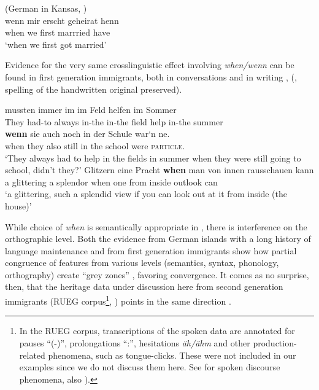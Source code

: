 \documentclass[output=paper]{langscibook}
\begin{document}
\ea%
    \label{ex:tsehaye:geheiratet}(German in Kansas, \citealt[196]{HoppPutnam2015})\\
    \gll wenn mir  erscht  geheirat   henn\\
	when  we    first     marrried  have \\
    \glt ‘when we first got married’ 
\z

Evidence for the very same crosslinguistic effect involving \textit{when/wenn} can be found in first generation immigrants, both in conversations  and in writing , (\citealt[421]{Tracy2022}, spelling of the handwritten original preserved).

\ea \label{ex:tsehaye:Feld}
   {mussten} {immer} {im} {im} {Feld} {helfen} {im} {Sommer}\\
       They   had-to always in-the in-the field help in-the summer\\
       \textbf{{wenn}} sie auch noch in der Schule war‘n ne.\\
       {when} they also still in the school were \textsc{particle.}\\
\glt ‘They always had to help in the fields in summer when they were still going to school, didn’t they?’
\ex\label{ex:tsehaye:Glitzern}
 {Glitzern} {eine} {Pracht} \textbf{{when}} {man} {von} {innen} {rausschauen} {kann}\\
     a glittering a splendor {when} one from inside outlook can\\
\glt ‘a glittering, such a splendid view if you can look out at it from inside (the house)’
\z

While choice of \textit{when} is semantically appropriate in , there is interference on the orthographic level. Both the evidence from German islands with a long history of language maintenance and from first generation immigrants show how partial congruence of features from various levels (semantics, syntax, phonology, orthography) create “grey zones” \citep[755]{Clyne1987}, favoring convergence. It comes as no surprise, then, that the heritage data under discussion here from second generation immigrants (RUEG corpus\footnote{In the RUEG corpus, transcriptions of the spoken data are annotated for pauses “(-)”, prolongations “:”, hesitations \textit{äh/ähm} and other production\hyp related phenomena, such as tongue\hyp clicks. These were not included in our examples since we do not discuss them here. See  for spoken discourse phenomena, also \citealt{BöttcherZellers2023, TracyGibbon2023}).}, \citealt{RUEGcorpus2024}) points in the same direction .
\end{document}
